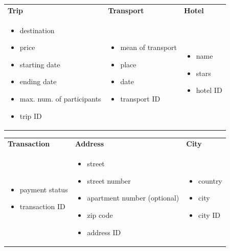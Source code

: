 \documentclass{article}
\begin{document}
    \begin{tabular}{p{}p{}p{}}
        \textbf{Trip} & \textbf{Transport} & \textbf{Hotel}\\
        \begin{itemize}
            \item destination
            \item price
            \item starting date
            \item ending date
            \item max. num. of participants
            \item trip ID 
        \end{itemize} & \begin{itemize}
            \item mean of transport
            \item place
            \item date 
            \item transport ID
        \end{itemize} & \begin{itemize}
            \item name
            \item stars
            \item hotel ID
        \end{itemize}\\
    \end{tabular}
    \begin{tabular}{p{}p{}p{}}
        \textbf{Transaction} & \textbf{Address} & \textbf{City}\\
        \begin{itemize}
            \item payment status
            \item transaction ID
        \end{itemize} & \begin{itemize}
            \item street 
            \item street number
            \item apartment number (optional)
            \item zip code
            \item address ID
        \end{itemize} & \begin{itemize}
            \item country
            \item city
            \item city ID
        \end{itemize}\\
    \end{tabular}
\end{document}
